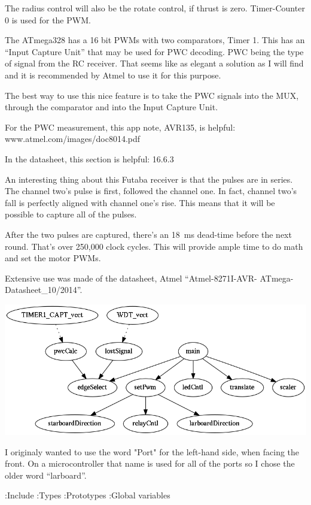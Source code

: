 The radius control will also be the rotate control, if thrust is zero.
Timer-Counter 0 is used for the PWM.

The ATmega328 has a 16 bit PWMs with two comparators, Timer 1.
This has an ``Input Capture Unit'' that may be used for PWC decoding.
PWC being the type of signal from the RC receiver.
That seems like as elegant a solution as I will find and it is recommended by
Atmel to use it for this purpose.

The best way to use this nice feature is to
take the PWC signals into the MUX, through the comparator and into the Input
Capture Unit.

For the PWC measurement, this app note, AVR135, is helpful:
www.atmel.com/images/doc8014.pdf


In the datasheet, this section is helpful: 16.6.3

An interesting thing about this Futaba receiver is that the pulses are in
series.
The channel two's pulse is first, followed the channel one.
In fact, channel two's fall is perfectly aligned with channel one's rise.
This means that it will be possible to capture all of the pulses.

After the two pulses are captured, there's an 18~ms dead-time before the next
round. That's over 250,000 clock cycles.
This will provide ample time to do math and set the motor PWMs.


Extensive use was made of the datasheet, Atmel
``Atmel-8271I-AVR- ATmega-Datasheet\_10/2014''.


\includegraphics[width=35 pc]{piruett.png}

I originaly wanted to use the word "Port" for the left-hand side, when facing
the front. On a microcontroller that name is used for all of the ports so I
chose the older word ``larboard''.

\Y\B{}:Include\X\6
:Types\X\6
:Prototypes\X\6
:Global variables\X\par
\fi

